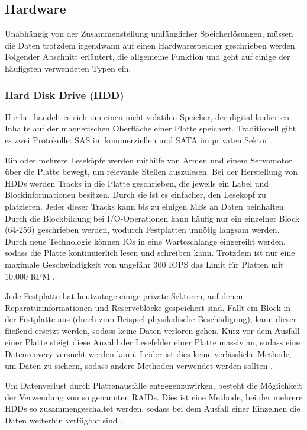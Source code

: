 \subsection{Hardware}

Unabhängig von der Zusammenstellung umfänglicher Speicherlösungen, müssen die Daten trotzdem irgendwann auf einen Hardwarespeicher geschrieben werden. Folgender Abschnitt erläutert, die allgemeine Funktion und geht auf einige der häufigsten verwendeten Typen ein.

\subsubsection{Hard Disk Drive (HDD)}

Hierbei handelt es sich um einen nicht volatilen Speicher, der digital kodierten Inhalte auf der magnetischen Oberfläche einer Platte speichert. Traditionell gibt es zwei Protokolle: SAS im kommerziellen und SATA im privaten Sektor \parencite{wikibooks.2016}.

Ein oder mehrere Leseköpfe werden mithilfe von Armen und einem Servomotor über die Platte bewegt, um relevante Stellen auszulesen. Bei der Herstellung von HDDs werden Tracks in die Platte geschrieben, die jeweils ein Label und Blockinformationen besitzen. Durch sie ist es einfacher, den Lesekopf zu platzieren. Jeder dieser Tracks kann bis zu einigen MBs an Daten beinhalten. Durch die Blockbildung bei I/O-Operationen kann häufig nur ein einzelner Block (64-256) geschrieben werden, wodurch Festplatten unnötig langsam werden. Durch neue Technologie können IOs in eine Warteschlange eingereiht werden, sodass die Platte kontinuierlich lesen und schreiben kann. Trotzdem ist nur eine maximale Geschwindigkeit von ungefähr 300 \gls{IOPS} das Limit für Platten mit 10.000 RPM \parencite[Kap. 3]{kaufmann.2016}.

Jede Festplatte hat heutzutage einige private Sektoren, auf denen Reparaturinformationen und Reserveblöcke gespeichert sind. Fällt ein Block in der Festplatte aus (durch zum Beispiel physikalische Beschädigung), kann dieser fließend ersetzt werden, sodass keine Daten verloren gehen. Kurz vor dem Ausfall einer Platte steigt diese Anzahl der Lesefehler einer Platte massiv an, sodass eine Datenreovery versucht werden kann. Leider ist dies keine verlässliche Methode, um Daten zu sichern, sodass andere Methoden verwendet werden sollten \parencite[Kap. 3]{kaufmann.2016}.

Um Datenverlust durch Plattenausfälle entgegenzuwirken, besteht die Möglichkeit der Verwendung von so genannten RAIDs. Dies ist eine Methode, bei der mehrere HDDs so zusammengeschaltet werden, sodass bei dem Ausfall einer Einzelnen die Daten weiterhin verfügbar sind \parencite{wikibooks.2016}.

